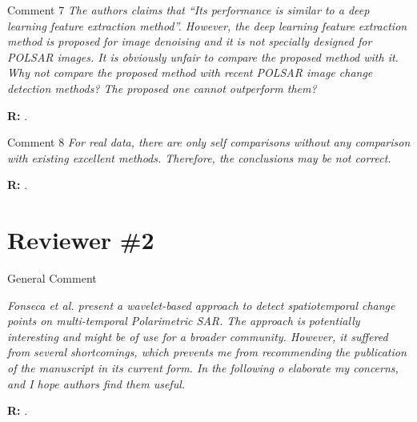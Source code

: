\documentclass[11pt]{report}
\begin{document}
\vspace{0.3cm}

\medskip
\begin{mybox}{Comment 7}
\textit{The authors claims that “Its performance is similar to a deep learning feature extraction method”. However, the deep
learning feature extraction method is proposed for image denoising and it is not specially designed for POLSAR images.
It is obviously unfair to compare the proposed method with it. Why not compare the proposed method with recent
POLSAR image change detection methods? The proposed one cannot outperform them?}


\medskip
\textbf{R:} .

\medskip

\end{mybox}

\vspace{0.3cm}

\medskip
\begin{mybox}{Comment 8}
\textit{For real data, there are only self comparisons without any comparison with existing excellent methods. Therefore, the
conclusions may be not correct.}


\medskip
\textbf{R:} .

\medskip

\end{mybox}



\newpage



\vspace{0.25cm}

\section*{Reviewer \#2}


\begin{mybox}{General Comment}

\textit{Fonseca et al. present a wavelet-based approach to detect spatiotemporal change points on multi-temporal Polarimetric
SAR. The approach is potentially interesting and might be of use for a broader community. However, it suffered from
several shortcomings, which prevents me from recommending the publication of the manuscript in its current form. In the
following o elaborate my concerns, and I hope authors find them useful.}

\medskip

\textbf{R:}  .
\end{mybox}
\end{document}
